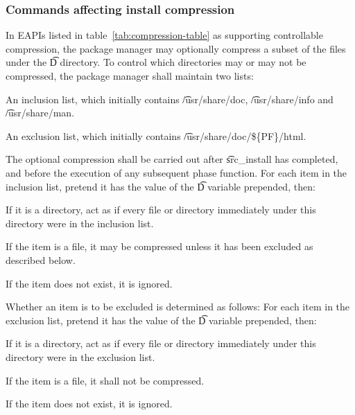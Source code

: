 \subsubsection{Commands affecting install compression}

 In EAPIs listed in table~\ref{tab:compression-table} as
supporting controllable compression, the package manager may optionally compress a subset of the
files under the \t{D} directory. To control which directories may or may not be compressed, the
package manager shall maintain two lists:

\begin{compactitem}
\item An inclusion list, which initially contains \t{/usr/share/doc}, \t{/usr/share/info} and
    \t{/usr/share/man}.
\item An exclusion list, which initially contains \t{/usr/share/doc/\$\{PF\}/html}.
\end{compactitem}

The optional compression shall be carried out after \t{src\_install} has completed, and before the
execution of any subsequent phase function. For each item in the inclusion list, pretend it has the
value of the \t{D} variable prepended, then:

\begin{compactitem}
\item If it is a directory, act as if every file or directory immediately under this directory
    were in the inclusion list.
\item If the item is a file, it may be compressed unless it has been excluded as described below.
\item If the item does not exist, it is ignored.
\end{compactitem}

Whether an item is to be excluded is determined as follows: For each item in the exclusion list,
pretend it has the value of the \t{D} variable prepended, then:

\begin{compactitem}
\item If it is a directory, act as if every file or directory immediately under this directory
    were in the exclusion list.
\item If the item is a file, it shall not be compressed.
\item If the item does not exist, it is ignored.
\end{compactitem}

